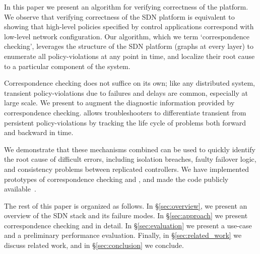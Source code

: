 In this paper we present an algorithm for verifying correctness of the
platform. We observe that verifying correctness of the SDN platform
is equivalent to showing that high-level policies specified by
control applications correspond with low-level network configuration.
Our algorithm, which we term `correspondence checking',
leverages the structure of the SDN platform (graphs at every layer)
to enumerate all policy-violations at any point in time, and localize their
root cause to a particular component of the system.

Correspondence checking does not suffice on its own; like any distributed
system, transient policy-violations due to failures and delays are 
common, especially at large scale. We present \simulator{}
to augment the diagnostic information provided by correspondence checking.
\Simulator{} allows troubleshooters 
to differentiate transient from persistent policy-violations by tracking the life cycle of problems 
both forward and backward in time.

We demonstrate that these mechanisms combined can be used to quickly
identify the root cause of difficult errors, including isolation breaches,
faulty failover logic, and consistency problems between replicated
controllers. We have implemented prototypes
of correspondence checking and \simulator{}, and made the code publicly
available~\cite{github}.

The rest of this paper is organized as follows. In \S\ref{sec:overview},
we present an overview of the SDN stack and its failure modes.
In \S\ref{sec:approach} we present correspondence checking and
\simulator{} in detail. In \S\ref{sec:evaluation} we present
a use-case and a preliminary performance evaluation.
Finally, in \S\ref{sec:related_work} we discuss related work,
and in \S\ref{sec:conclusion} we conclude.
